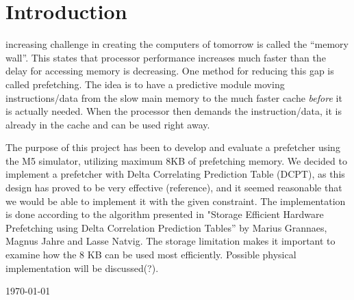 \section{Introduction}

 increasing challenge in creating the computers of tomorrow
is called the ``memory wall''. This states that processor performance increases
much faster than the delay for accessing memory is decreasing. One method for
reducing this gap is called prefetching. The idea is to have a predictive module
moving  instructions/data from the slow main memory to the much faster cache
\emph{before} it is actually needed. When the processor then demands the
instruction/data, it is already in the cache and can be used right away.


The purpose of this project has been to develop and evaluate a prefetcher using
the M5 simulator, utilizing maximum 8KB of prefetching memory. We decided to
implement a prefetcher with Delta Correlating Prediction Table (DCPT), as this
design has proved to be very effective (reference), and it seemed reasonable
that we would be able to implement it with the given constraint. The
implementation is done according to the algorithm presented in "Storage
Efficient Hardware Prefetching using Delta Correlation Prediction Tables” by
Marius Grannaes, Magnus Jahre and Lasse Natvig. The storage limitation makes it
important to examine how the 8 KB can be used most efficiently. Possible
physical implementation will be discussed(?).


\hfill \today

